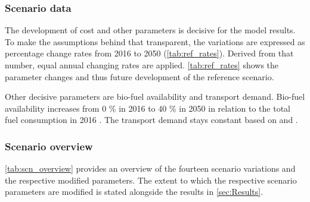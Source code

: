 \documentclass[article]{elsarticle}
\begin{document}
\subsubsection{Scenario data}
The development of cost and other parameters is decisive for the model results. To make the assumptions behind that transparent, the variations are expressed as percentage change rates from 2016 to 2050 (\autoref{tab:ref_rates}). Derived from that number, equal annual changing rates are applied. \autoref{tab:ref_rates} shows the parameter changes and thus future development of the reference scenario.

Other decisive parameters are bio-fuel availability and transport demand. Bio-fuel availability increases from 0 \% in 2016 to 40 \% in 2050 in relation to the total fuel consumption in 2016 \cite{DEA2016}. The transport demand stays constant based on \cite[p.~18]{ITF2018} and \cite[p.~19]{Rex2017}.


\subsubsection{Scenario overview}
\autoref{tab:scn_overview} provides an overview of the fourteen scenario variations and the respective modified parameters. The extent to which the respective scenario parameters are modified is stated alongside the results in \autoref{sec:Results}.
\end{document}
